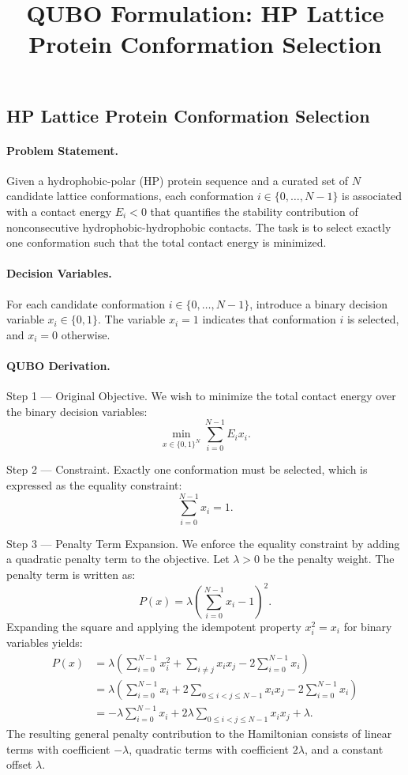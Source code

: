 \documentclass[12pt]{article}
\title{QUBO Formulation: HP Lattice Protein Conformation Selection}
\date{}
\begin{document}
\maketitle

\subsection*{HP Lattice Protein Conformation Selection}

\paragraph{Problem Statement.}
Given a hydrophobic-polar (HP) protein sequence and a curated set of $N$ candidate lattice conformations, each conformation $i \in \{0, \dots, N-1\}$ is associated with a contact energy $E_i < 0$ that quantifies the stability contribution of nonconsecutive hydrophobic-hydrophobic contacts. The task is to select exactly one conformation such that the total contact energy is minimized.

\paragraph{Decision Variables.}
For each candidate conformation $i \in \{0, \dots, N-1\}$, introduce a binary decision variable $x_i \in \{0, 1\}$. The variable $x_i = 1$ indicates that conformation $i$ is selected, and $x_i = 0$ otherwise.

\paragraph{QUBO Derivation.}
Step 1 --- Original Objective. We wish to minimize the total contact energy over the binary decision variables:
\[
\min_{x \in \{0,1\}^N} \sum_{i=0}^{N-1} E_i x_i.
\]

Step 2 --- Constraint. Exactly one conformation must be selected, which is expressed as the equality constraint:
\[
\sum_{i=0}^{N-1} x_i = 1.
\]

Step 3 --- Penalty Term Expansion. We enforce the equality constraint by adding a quadratic penalty term to the objective. Let $\lambda > 0$ be the penalty weight. The penalty term is written as:
\[
P(x) = \lambda \left( \sum_{i=0}^{N-1} x_i - 1 \right)^2.
\]
Expanding the square and applying the idempotent property $x_i^2 = x_i$ for binary variables yields:
\begin{align}
P(x) &= \lambda \left( \sum_{i=0}^{N-1} x_i^2 + \sum_{i \neq j} x_i x_j - 2 \sum_{i=0}^{N-1} x_i \right) \\
&= \lambda \left( \sum_{i=0}^{N-1} x_i + 2 \sum_{0 \leq i < j \leq N-1} x_i x_j - 2 \sum_{i=0}^{N-1} x_i \right) \\
&= -\lambda \sum_{i=0}^{N-1} x_i + 2\lambda \sum_{0 \leq i < j \leq N-1} x_i x_j + \lambda.
\end{align}
The resulting general penalty contribution to the Hamiltonian consists of linear terms with coefficient $-\lambda$, quadratic terms with coefficient $2\lambda$, and a constant offset $\lambda$.
\end{document}
